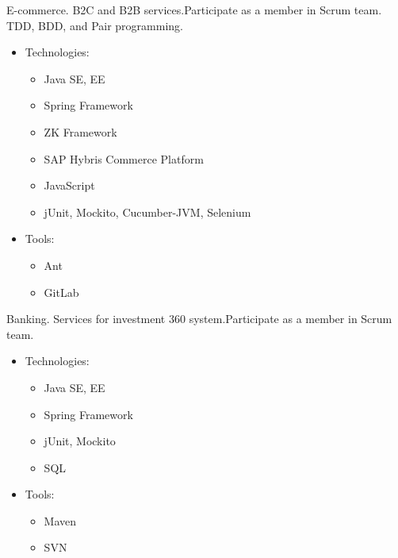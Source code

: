 \documentclass[11pt, a4paper]{moderncv}
\begin{document}
{E-commerce. B2C and B2B services.\newline{}Participate as a member in Scrum team. TDD, BDD, and Pair programming. 
\begin{itemize}
\item Technologies:
\begin{itemize}
\item Java SE, EE
\item Spring Framework
\item ZK Framework
\item SAP Hybris Commerce Platform
\item JavaScript
\item jUnit, Mockito, Cucumber-JVM, Selenium
\end{itemize}
\item Tools:
\begin{itemize}
\item Ant
\item GitLab
\end{itemize}
\end{itemize}}

{Banking. Services for investment 360 system.\newline{}Participate as a member in Scrum team.
\begin{itemize}
\item Technologies:
\begin{itemize}
\item Java SE, EE
\item Spring Framework
\item jUnit, Mockito
\item SQL
\end{itemize}
\item Tools:
\begin{itemize}
\item Maven
\item SVN
\end{itemize}
\end{itemize}}
\end{document}
